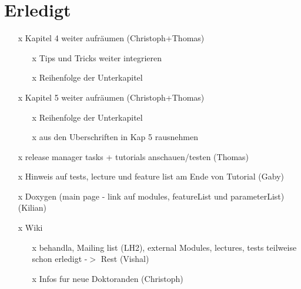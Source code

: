 \section*{Erledigt}
\begin{itemize}
  \item[x] Kapitel 4 weiter aufräumen (Christoph+Thomas)
  \begin{itemize}
    \item[x] Tips und Tricks weiter integrieren
    \item[x] Reihenfolge der Unterkapitel
  \end{itemize}
  \item[x] Kapitel 5 weiter aufräumen (Christoph+Thomas)
  \begin{itemize}
    \item[x] Reihenfolge der Unterkapitel
    \item[x] \Dumux aus den Uberschriften in Kap 5 rausnehmen
  \end{itemize}
  \item[x] release manager tasks + tutorials anschauen/testen (Thomas)
  \item[x] Hinweis auf tests, lecture und feature list am Ende von Tutorial
        (Gaby)
  \item[x] Doxygen (main page - link auf modules, featureList und parameterList)
        (Kilian)
  \item[x] Wiki
  \begin{itemize}
    \item[x] behandla, Mailing list (LH2), external Modules, lectures, tests
             teilweise schon erledigt -$>$ Rest (Vishal)
    \item[x] Infos fur neue Doktoranden (Christoph)
  \end{itemize}
\end{itemize}
